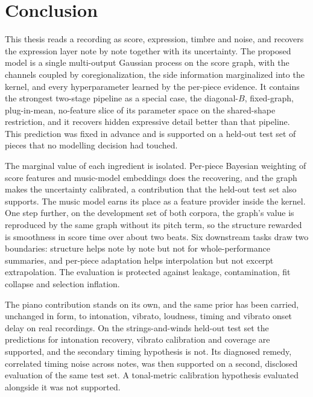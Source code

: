 \chapter{Conclusion}\label{ch:conclusion}
This thesis reads a recording as score, expression, timbre and noise, and
recovers the expression layer note by note together with its uncertainty.
The proposed model is a single multi-output Gaussian process on the score
graph, with the channels coupled by coregionalization, the side information
marginalized into the kernel, and every hyperparameter learned by the
per-piece evidence. It contains the strongest two-stage pipeline as a
special case, the diagonal-$B$, fixed-graph, plug-in-mean, no-feature slice
of its parameter space on the shared-shape restriction, and it recovers
hidden expressive detail better than that pipeline. This prediction was
fixed in advance and is supported on a held-out test set of pieces that no
modelling decision had touched.

The marginal value of each ingredient is isolated. Per-piece Bayesian
weighting of score features and music-model embeddings does the recovering,
and the graph makes the uncertainty calibrated, a contribution that the
held-out test set also supports. The music model earns its place as a
feature provider inside the kernel. One step further, on the development
set of both corpora, the graph's value is reproduced by the same graph
without its pitch term, so the structure rewarded is smoothness in score
time over about two beats. Six downstream tasks draw two boundaries:
structure helps note by note but not for whole-performance summaries, and
per-piece adaptation helps interpolation but not excerpt extrapolation. The
evaluation is protected against leakage, contamination, fit collapse and
selection inflation.

The piano contribution stands on its own, and the same prior has been
carried, unchanged in form, to intonation, vibrato, loudness, timing and
vibrato onset delay on real recordings. On the strings-and-winds held-out
test set the predictions for intonation recovery, vibrato calibration and
coverage are supported, and the secondary timing hypothesis is not. Its diagnosed remedy, correlated timing noise across
notes, was then supported on a second, disclosed evaluation of the same test
set. A tonal-metric calibration hypothesis evaluated alongside it was not
supported.

